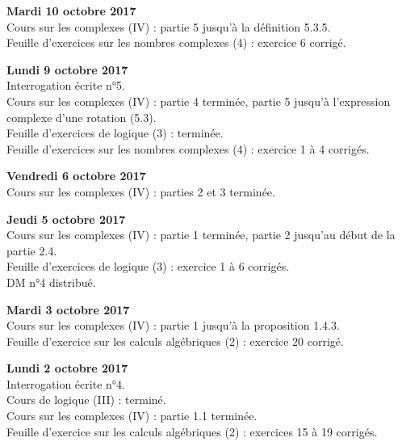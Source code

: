 \documentclass[12pt,a4paper]{article}
\begin{document}
\noindent\textbf{Mardi 10 octobre 2017}\\
\bu{} Cours sur les complexes (IV) : partie 5 jusqu'à la définition 5.3.5. \\
\bu{} Feuille d'exercices sur les nombres complexes (4) : exercice 6 corrigé. \\
\vspace{.4cm}

\noindent\textbf{Lundi 9 octobre 2017}\\
\bu{} Interrogation écrite n°5.\\
\bu{} Cours sur les complexes (IV) : partie 4 terminée, partie 5 jusqu'à l'expression complexe d'une rotation (5.3). \\
\bu{} Feuille d'exercices de logique (3) : terminée. \\
\bu{} Feuille d'exercices sur les nombres complexes (4) : exercice 1 à 4 corrigés. \\
\vspace{.4cm}

\noindent\textbf{Vendredi 6 octobre 2017}\\
\bu{} Cours sur les complexes (IV) : parties 2 et 3 terminée. \\
\vspace{.4cm}

\noindent\textbf{Jeudi 5 octobre 2017}\\
\bu{} Cours sur les complexes (IV) : partie 1 terminée, partie 2 jusqu'au début de la partie 2.4. \\
\bu{} Feuille d'exercices de logique (3) : exercice 1 à 6 corrigés. \\
\bu{} DM n°4 distribué.\\
\vspace{.4cm}

\noindent\textbf{Mardi 3 octobre 2017}\\
\bu{} Cours sur les complexes (IV) : partie 1 jusqu'à la proposition 1.4.3. \\
\bu{} Feuille d'exercice sur les calculs algébriques (2) : exercice 20 corrigé. \\
\vspace{.4cm}

\noindent\textbf{Lundi 2 octobre 2017}\\
\bu{} Interrogation écrite n°4.\\
\bu{} Cours de logique (III) : terminé. \\
\bu{} Cours sur les complexes (IV) : partie 1.1 terminée. \\
\bu{} Feuille d'exercice sur les calculs algébriques (2) : exercices 15 à 19 corrigés. \\
\vspace{.4cm}
\end{document}
